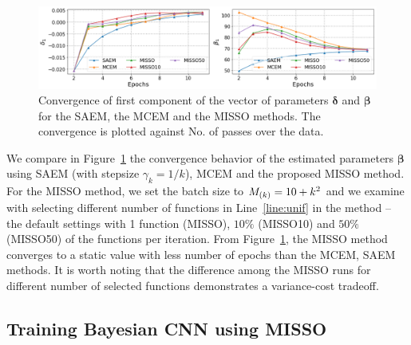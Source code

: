 \documentclass[11pt]{article}
\theoremstyle{t}
\begin{document}
\begin{figure}[H]
\includegraphics[width=\textwidth]{pic_paper/traumabasenoexp.png}\vspace{-.2cm}
\caption{Convergence of first component of the vector of parameters ${\bm \delta}$ and ${\bm \beta}$ for the SAEM, the MCEM and the MISSO methods. The convergence is plotted against No. of passes over the data.}\vspace{-.2cm}
\label{fig:misso_trauma}
\end{figure}

We compare in Figure~\ref{fig:misso_trauma} the convergence behavior of the estimated parameters $\bm{\beta}$ using SAEM \citep{delyon1999} (with stepsize $\gamma_k = 1/k$), MCEM \citep{wei1990mcem}  and the proposed MISSO method.
For the MISSO method, we set the batch size to $\Bsize{k} = 10 + k^2$ and we examine with selecting different number of functions in Line~\ref{line:unif} in the method -- the default settings with 1 function (MISSO), $10\%$ (MISSO10) and $50\%$ (MISSO50) of the functions per iteration.
From Figure~\ref{fig:misso_trauma}, the MISSO method converges to a static value with less number of epochs than the MCEM, SAEM methods.
It is worth noting that the difference among the MISSO runs for different number of selected functions demonstrates a variance-cost tradeoff.

\vspace{-0.05in}
\subsection{Training Bayesian CNN using MISSO}
\vspace{-0.05in}
\end{document}
